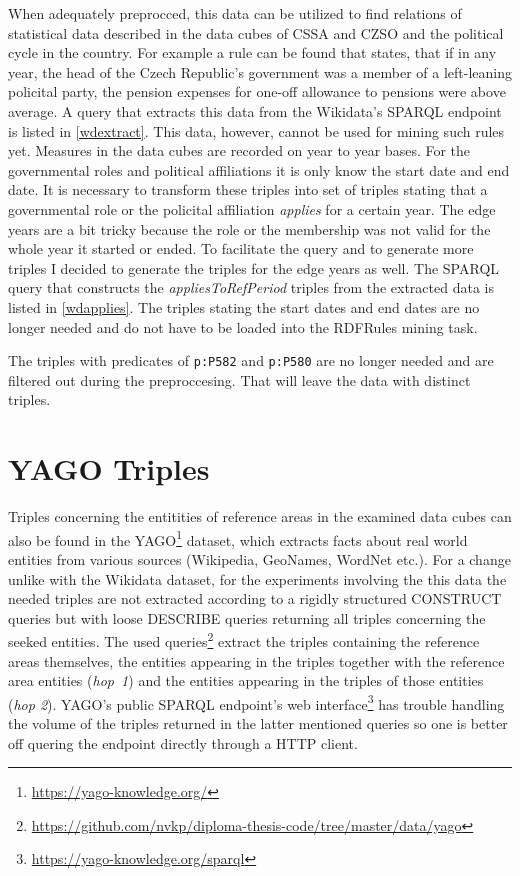 When adequately preprocced, this data can be utilized to find relations of statistical data described in the data cubes of CSSA and CZSO and the political cycle in the country. For example a rule can be found that states, that if in any year, the head of the Czech Republic's government was a member of a left-leaning policital party, the pension expenses for one-off allowance to pensions were above average. A query that extracts this data from the Wikidata's SPARQL endpoint is listed in \ref{wdextract}. This data, however, cannot be used for mining such rules yet. Measures in the data cubes are recorded on year to year bases. For the governmental roles and political affiliations it is only know the start date and end date. It is necessary to transform these triples into set of triples stating that a governmental role or the policital affiliation \textit{applies} for a certain year. The edge years are a bit tricky because the role or the membership was not valid for the whole year it started or ended. To facilitate the query and to generate more triples I decided to generate the triples for the edge years as well. The SPARQL query that constructs the \textit{appliesToRefPeriod} triples from the extracted data is listed in \ref{wdapplies}. The triples stating the start dates and end dates are no longer needed and do not have to be loaded into the RDFRules mining task.

The triples with predicates of \verb|p:P582| and \verb|p:P580| are no longer needed and are filtered out during the preproccesing. That will leave the data with  distinct triples.

\section{YAGO Triples}

Triples concerning the entitities of reference areas in the examined data cubes can also be found in the YAGO\footnote{\href{https://yago-knowledge.org/}{https://yago-knowledge.org/}} dataset, which extracts facts about real world entities from various sources (Wikipedia, GeoNames, WordNet etc.). For a change unlike with the Wikidata dataset, for the experiments involving the this data the needed triples are not extracted according to a rigidly structured CONSTRUCT queries but with loose DESCRIBE queries returning all triples concerning the seeked entities. The used queries\footnote{\href{https://github.com/nvkp/diploma-thesis-code/tree/master/data/yago}{https://github.com/nvkp/diploma-thesis-code/tree/master/data/yago}} extract the triples containing the reference areas themselves, the entities appearing in the triples together with the reference area entities (\textit{hop~1}) and the entities appearing in the triples of those entities (\textit{hop 2}). YAGO's public SPARQL endpoint's web interface\footnote{\href{https://yago-knowledge.org/sparql}{https://yago-knowledge.org/sparql}} has trouble handling the volume of the triples returned in the latter mentioned queries so one is better off quering the endpoint directly through a HTTP client.

